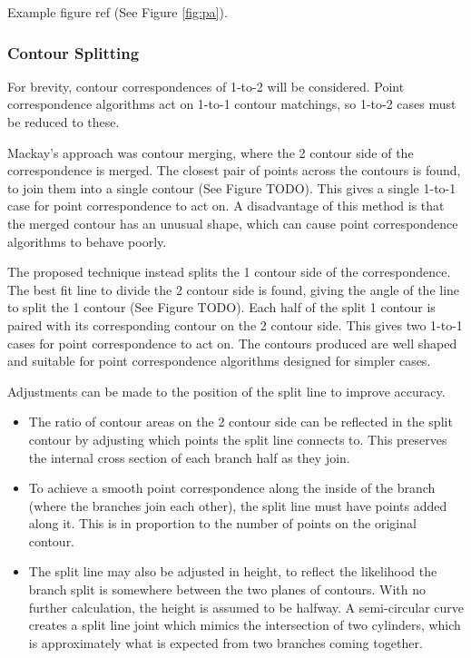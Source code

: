\documentclass[11p, titlepage]{article}
\begin{document}
Example figure ref (See Figure \ref{fig:pa}).

\subsubsection{Contour Splitting}

For brevity, contour correspondences of 1-to-2 will be considered. Point correspondence algorithms act on 1-to-1 contour matchings, so 1-to-2 cases must be reduced to these. 

Mackay's approach was contour merging, where the 2 contour side of the correspondence is merged. The closest pair of points across the contours is found, to join them into a single contour (See Figure TODO). This gives a single 1-to-1 case for point correspondence to act on. A disadvantage of this method is that the merged contour has an unusual shape, which can cause point correspondence algorithms to behave poorly.

The proposed technique instead splits the 1 contour side of the correspondence. The best fit line to divide the 2 contour side is found, giving the angle of the line to split the 1 contour (See Figure TODO). Each half of the split 1 contour is paired with its corresponding contour on the 2 contour side. This gives two 1-to-1 cases for point correspondence to act on. The contours produced are well shaped and suitable for point correspondence algorithms designed for simpler cases.

Adjustments can be made to the position of the split line to improve accuracy. 
\begin{itemize}
\item The ratio of contour areas on the 2 contour side can be reflected in the split contour by adjusting which points the split line connects to. This preserves the internal cross section of each branch half as they join. 
\item To achieve a smooth point correspondence along the inside of the branch (where the branches join each other), the split line must have points added along it. This is in proportion to the number of points on the original contour.
\item The split line may also be adjusted in height, to reflect the likelihood the branch split is somewhere between the two planes of contours. With no further calculation, the height is assumed to be halfway. A semi-circular curve creates a split line joint which mimics the intersection of two cylinders, which is approximately what is expected from two branches coming together.
\end{itemize}
\end{document}
